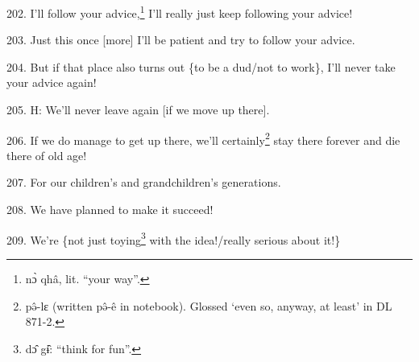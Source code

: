 202. I'll follow your advice,\footnote{nɔ̀ qhâ, lit. ``your way''.} I'll really just keep following your advice!

203. Just this once [more] I'll be patient and try to follow your advice.

204. But if that place also turns out \{to be a dud/not to work\}, I'll never take
your advice again!

205. H: We'll never leave again [if we move up there].

206. If we do manage to get up there, we'll certainly\footnote{pə̂-lɛ (written pə̂-ê in notebook). Glossed `even so, anyway, at least' in DL 871-2.} stay there forever and
die there of old age!

207. For our children's and grandchildren's generations.

208. We have planned to make it succeed!

209. We're \{not just toying\footnote{dɔ̂ gɨ̂: ``think for fun''.} with the idea!/really serious about it!\}

